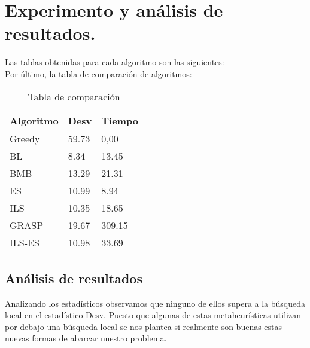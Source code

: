 \newpage
\section{Experimento y análisis de resultados.}

Las tablas obtenidas para cada algoritmo son las siguientes:\\




















\newpage
Por último, la tabla de comparación de algoritmos:

\begin{table}[htbp]
	\begin{center}
		\begin{tabular}{|l|l|l|}
			\hline
			Algoritmo &  Desv & Tiempo\\
			\hline \hline
			Greedy & 59.73 & 0,00\\ \hline
			BL & 8.34 & 13.45 \\ \hline
			BMB & 13.29 & 21.31 \\ \hline
			ES & 10.99 & 8.94 \\ \hline
			ILS & 10.35 & 18.65 \\ \hline
			GRASP & 19.67 & 309.15 \\ \hline
			ILS-ES & 10.98 & 33.69 \\ \hline
		\end{tabular}
		\caption{Tabla de comparación}
		\label{tabla:TablaComparacion}
	\end{center}
\end{table}

\newpage

\subsection{Análisis de resultados}

Analizando los estadísticos observamos que ninguno de ellos supera a la búsqueda local en el estadístico Desv. Puesto que algunas de estas metaheurísticas  utilizan por debajo una búsqueda local se nos plantea si realmente son buenas estas nuevas formas de abarcar nuestro problema.\\

